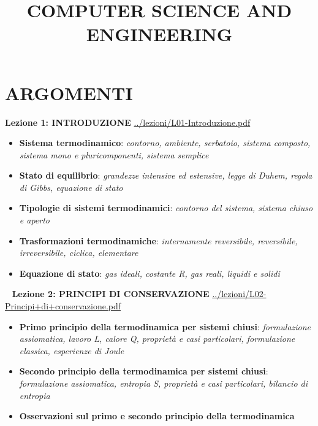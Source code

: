\documentclass[a4paper, 9pt]{article}
\title{COMPUTER SCIENCE AND ENGINEERING}
\begin{document}
    \maketitle
    \tableofcontents
    \newpage
    \section{ARGOMENTI}

    \textbf{Lezione 1: INTRODUZIONE}\newline
    \url{../lezioni/L01-Introduzione.pdf}
    \begin{itemize}
        \item \textbf{Sistema termodinamico}: \textit{contorno, ambiente, serbatoio, sistema composto, sistema mono e pluricomponenti, sistema semplice}
        \item \textbf{Stato di equilibrio}: \textit{grandezze intensive ed estensive, legge di Duhem, regola di Gibbs, equazione di stato}
        \item \textbf{Tipologie di sistemi termodinamici}: \textit{contorno del sistema, sistema chiuso e aperto}
        \item \textbf{Trasformazioni termodinamiche}: \textit{internamente reversibile, reversibile, irreversibile, ciclica, elementare}
        \item \textbf{Equazione di stato}: \textit{gas ideali, costante R, gas reali, liquidi e solidi}
    \end{itemize}
    \ \newline
    \newline
    \textbf{Lezione 2: PRINCIPI DI CONSERVAZIONE}\newline
    \url{../lezioni/L02-Principi+di+conservazione.pdf}
    \begin{itemize}
        \item \textbf{Primo principio della termodinamica per sistemi chiusi}: \textit{formulazione assiomatica, lavoro L, calore Q, proprietà e casi particolari, formulazione classica, esperienze di Joule}
        \item \textbf{Secondo principio della termodinamica per sistemi chiusi}: \textit{formulazione assiomatica, entropia S, proprietà e casi particolari, bilancio di entropia}
        \item \textbf{Osservazioni sul primo e secondo principio della termodinamica}
    \end{itemize}
    \ \newline
    \newline
\end{document}

